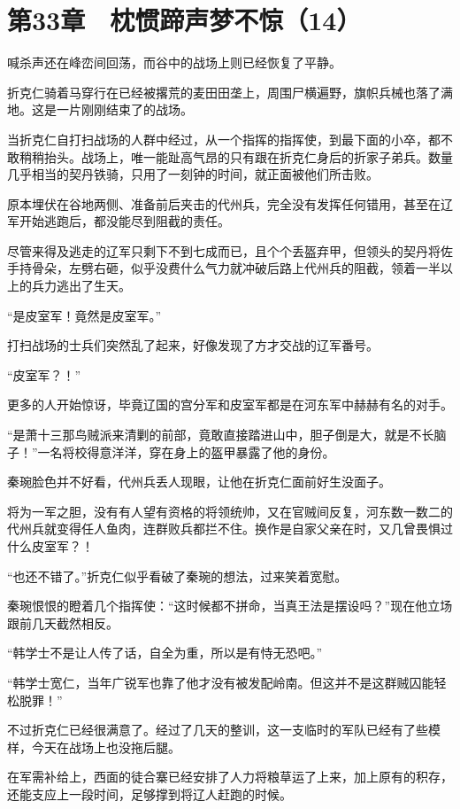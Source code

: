 \section{第33章　枕惯蹄声梦不惊（14）}

喊杀声还在峰峦间回荡，而谷中的战场上则已经恢复了平静。

折克仁骑着马穿行在已经被撂荒的麦田田垄上，周围尸横遍野，旗帜兵械也落了满地。这是一片刚刚结束了的战场。

当折克仁自打扫战场的人群中经过，从一个指挥的指挥使，到最下面的小卒，都不敢稍稍抬头。战场上，唯一能趾高气昂的只有跟在折克仁身后的折家子弟兵。数量几乎相当的契丹铁骑，只用了一刻钟的时间，就正面被他们所击败。

原本埋伏在谷地两侧、准备前后夹击的代州兵，完全没有发挥任何错用，甚至在辽军开始逃跑后，都没能尽到阻截的责任。

尽管来得及逃走的辽军只剩下不到七成而已，且个个丢盔弃甲，但领头的契丹将佐手持骨朵，左劈右砸，似乎没费什么气力就冲破后路上代州兵的阻截，领着一半以上的兵力逃出了生天。

“是皮室军！竟然是皮室军。”

打扫战场的士兵们突然乱了起来，好像发现了方才交战的辽军番号。

“皮室军？！”

更多的人开始惊讶，毕竟辽国的宫分军和皮室军都是在河东军中赫赫有名的对手。

“是萧十三那鸟贼派来清剿的前部，竟敢直接踏进山中，胆子倒是大，就是不长脑子！”一名将校得意洋洋，穿在身上的盔甲暴露了他的身份。

秦琬脸色并不好看，代州兵丢人现眼，让他在折克仁面前好生没面子。

将为一军之胆，没有有人望有资格的将领统帅，又在官贼间反复，河东数一数二的代州兵就变得任人鱼肉，连群败兵都拦不住。换作是自家父亲在时，又几曾畏惧过什么皮室军？！

“也还不错了。”折克仁似乎看破了秦琬的想法，过来笑着宽慰。

秦琬恨恨的瞪着几个指挥使：“这时候都不拼命，当真王法是摆设吗？”现在他立场跟前几天截然相反。

“韩学士不是让人传了话，自全为重，所以是有恃无恐吧。”

“韩学士宽仁，当年广锐军也靠了他才没有被发配岭南。但这并不是这群贼囚能轻松脱罪！”

不过折克仁已经很满意了。经过了几天的整训，这一支临时的军队已经有了些模样，今天在战场上也没拖后腿。

在军需补给上，西面的徒合寨已经安排了人力将粮草运了上来，加上原有的积存，还能支应上一段时间，足够撑到将辽人赶跑的时候。

